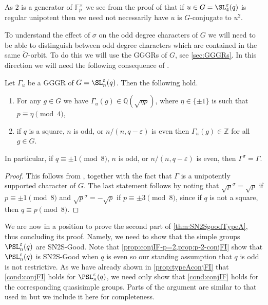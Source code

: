 \documentclass[eqthmnum, nocolour]{jt-calcs}
\newcommand{\Q}{\mathbb{Q}}
\renewcommand{\epsilon}{\varepsilon}
\begin{document}
\begin{rem}
As $2$ is a generator of $\mathbb{F}_p^{\times}$ we see from the proof of \cite[6.7]{tiep-zalesski:2004:unipotent-elements} that if $u \in G = \SL_4^{\varepsilon}(q)$ is regular unipotent then we need not necessarily have $u$ is $G$-conjugate to $u^2$.
\end{rem}

\begin{pa}
To understand the effect of $\sigma$ on the odd degree characters of $G$ we will need to be able to distinguish between odd degree characters which are contained in the same $\widetilde{G}$-orbit. To do this we will use the GGGRs of $G$, see \cref{sec:GGGRs}. In this direction we will need the following consequence of \cite{tiep-zalesski:2004:unipotent-elements}.
\end{pa}

\begin{proposition}\label{prop:GGGRvalues}
Let $\Gamma_u$ be a GGGR of $G = \SL_n^{\varepsilon}(q)$. Then the following hold.
\begin{enumerate}
	\item For any $g \in G$ we have $\Gamma_u(g) \in \Q(\sqrt{\eta p})$, where $\eta\in\{\pm1\}$ is such that $p\equiv\eta\pmod{4}$,
\item if $q$ is a square, $n$ is odd, or $n/(n,q-\epsilon)$ is even then $\Gamma_u(g) \in \mathbb{Z}$ for all $g \in G$.
\end{enumerate}
In particular, if $q\equiv \pm1\pmod 8$, $n$ is odd, or $n/(n,q-\epsilon)$ is even, then $\Gamma^\sigma=\Gamma$.
\end{proposition}

\begin{proof}
This follows from \cite[Theorem 1.8, Lemma 2.6, and Theorem 10.10]{tiep-zalesski:2004:unipotent-elements}, together with the fact that $\Gamma$ is a unipotently supported character of $G$.  The last statement follows by noting that $\sqrt{p}^\sigma=\sqrt{p}$ if $p\equiv \pm1\pmod 8$ and $\sqrt{p}^\sigma=-\sqrt{p}$ if $p\equiv \pm3\pmod 8$, since if $q$ is not a square, then $q\equiv p\pmod 8$. 
\end{proof}

\begin{pa}
We are now in a position to prove the second part of \cref{thm:SN2SgoodTypeA}, thus concluding its proof. Namely, we need to show that the simple groups $\PSL_n^{\varepsilon}(q)$ are SN2S-Good. Note that \cref{prop:conjIF-p=2,prop:p-2-conjFI} show that $\PSL_n^{\varepsilon}(q)$ is SN2S-Good when $q$ is even so our standing assumption that $q$ is odd is not restrictive. As we have already shown in \cref{prop:typeAconjFI} that \cref{cond:conjFI} holds for $\PSL_n^{\varepsilon}(q)$, we need only show that \cref{cond:conjIF} holds for the corresponding quasisimple groups. Parts of the argument are similar to that used in \cite[Theorem 4.15, part (3)]{schaeffer-fry:2015:odd-degree-characters} but we include it here for completeness.
\end{pa}
\end{document}
